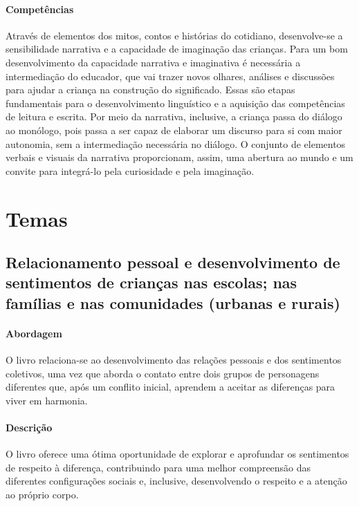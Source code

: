 \documentclass[11pt]{extarticle}
\begin{document}
\paragraph{Competências} 
Através de elementos dos mitos, contos e histórias do cotidiano, desenvolve-se a sensibilidade narrativa e a capacidade de imaginação das crianças. Para um bom desenvolvimento da capacidade narrativa e imaginativa é necessária a intermediação do educador, que vai trazer novos olhares, análises e discussões para ajudar a criança na construção do significado. Essas são etapas fundamentais para o desenvolvimento linguístico e a aquisição das competências de leitura e escrita. Por meio da narrativa, inclusive, a criança passa do diálogo ao monólogo, pois passa a ser capaz de elaborar um discurso para si com maior autonomia, sem a intermediação necessária no diálogo.
O conjunto de elementos verbais e visuais da narrativa proporcionam, assim,
uma abertura ao mundo e um convite para integrá-lo pela curiosidade e pela imaginação.


\section{Temas}

\subsection{Relacionamento pessoal e desenvolvimento de sentimentos de crianças nas escolas; nas famílias e nas comunidades (urbanas e rurais)}

\paragraph{Abordagem} O livro relaciona-se ao desenvolvimento das relações pessoais e dos sentimentos coletivos, uma vez que aborda o contato entre dois grupos de personagens diferentes que, após um conflito inicial, aprendem a aceitar as diferenças para viver em harmonia.

\paragraph{Descrição} O livro oferece uma ótima oportunidade de explorar 
e aprofundar os sentimentos de respeito à diferença, contribuindo para uma melhor compreensão das diferentes configurações sociais e, inclusive, desenvolvendo o respeito e a atenção ao próprio corpo.
\end{document}
